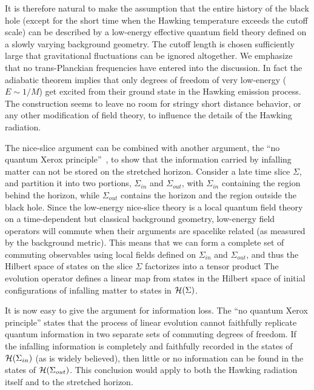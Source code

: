 It is therefore natural to make the assumption that the
entire history of the black hole (except for the short time when the
Hawking temperature
exceeds the cutoff scale) can be described by a low-energy effective
quantum field theory defined on a slowly varying background
geometry.  The cutoff length is chosen sufficiently large that
gravitational fluctuations can be ignored altogether.
We emphasize that no trans-Planckian frequencies have entered into
the discussion.  In fact the adiabatic theorem implies that only
degrees of freedom of very low-energy ($E\sim 1/M$) get excited
from their ground state in the Hawking emission process.  The
construction seems to leave no room for stringy short distance
behavior, or any other modification of field theory, to influence the
details of the Hawking radiation.

The nice-slice argument can be combined with another argument, the
``no quantum Xerox principle''~, to show that the
information carried by infalling matter can not be stored on the
stretched horizon.  Consider a late time slice $\Sigma$, and
partition it into two portions, $\Sigma_{in}$ and $\Sigma_{out}$,
with $\Sigma_{in}$ containing the region behind the horizon,
while $\Sigma_{out}$ contains the horizon and the region outside
the black hole.  Since the low-energy nice-slice theory is a local
quantum field theory on a time-dependent but classical background
geometry, low-energy field operators will commute when their
arguments are spacelike related (as measured by the background
metric).  This means that we can form a complete set of commuting
observables using local fields defined on $\Sigma_{in}$ and
$\Sigma_{out}$, and thus the Hilbert space of states on the slice
$\Sigma$ factorizes into a tensor product
\eqn{}
The evolution operator defines a linear map from states in the
Hilbert space of initial configurations of infalling matter
to states in ${\cal H}(\Sigma)$.

It is now easy to give the argument for information loss.  The ``no
quantum Xerox principle'' states that the process of linear evolution
cannot faithfully replicate quantum information in two separate sets
of commuting degrees of freedom.  If the infalling information is
completely and faithfully recorded in the states of ${\cal
H}(\Sigma_{in})$ (as is widely believed), then little or no
information can be found in the states of ${\cal
H}(\Sigma_{out})$.  This conclusion would apply to both the Hawking
radiation itself and to the stretched horizon.

